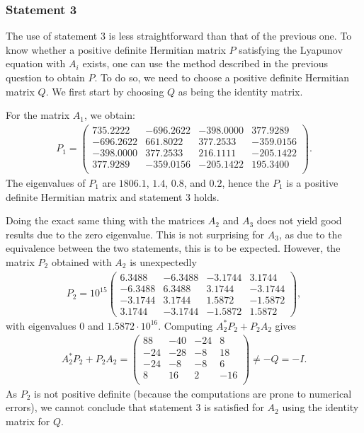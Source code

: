 \documentclass[11pt]{article}
\begin{document}
\subsubsection*{Statement 3}
The use of statement 3 is less straightforward than that of the previous one. To know whether a positive definite Hermitian matrix $P$ satisfying the Lyapunov equation with $A_i$ exists, one can use the method described in the previous question to obtain $P$. To do so, we need to choose a positive definite Hermitian matrix $Q$. We first start by choosing $Q$ as being the identity matrix.

For the matrix $A_1$, we obtain:
\begin{align*}
P_1=
    \begin{pmatrix}
    735.2222& -696.2622& -398.0000&  377.9289\\
    -696.2622&  661.8022&  377.2533& -359.0156\\
    -398.0000&  377.2533&  216.1111& -205.1422\\
    377.9289& -359.0156& -205.1422&  195.3400\\
    \end{pmatrix}.
\end{align*}
The eigenvalues of $P_1$ are $1806.1$, $1.4$, $0.8$, and $0.2$, hence the $P_1$ is a positive definite Hermitian matrix and statement 3 holds.

Doing the exact same thing with the matrices $A_2$ and $A_3$ does not yield good results due to the zero eigenvalue. This is not surprising for \(A_3\), as due to the equivalence between the two statements, this is to be expected. However, the matrix \(P_2\) obtained with $A_2$ is unexpectedly
\begin{align*}
P_2 = 10^{15}
    \begin{pmatrix}
    6.3488&   -6.3488&   -3.1744&    3.1744\\
   -6.3488&    6.3488&    3.1744&   -3.1744\\
   -3.1744&    3.1744&    1.5872&   -1.5872\\
    3.1744&   -3.1744&   -1.5872&    1.5872
    \end{pmatrix},
\end{align*}
with eigenvalues $0$ and $1.5872\cdot 10^{16}$.
Computing $A_2^*P_2+P_2A_2$ gives
\begin{align*}
    A_2^*P_2+P_2A_2=
    \begin{pmatrix}
    88&   -40&   -24&     8\\
   -24&   -28&    -8&    18\\
   -24&    -8&    -8&     6\\
     8&    16&     2&   -16\\
    \end{pmatrix}\neq -Q = -I.
\end{align*}
As $P_2$ is not positive definite (because the computations are prone to numerical errors), we cannot conclude that statement 3 is satisfied for $A_2$ using the identity matrix for $Q$.
\end{document}
